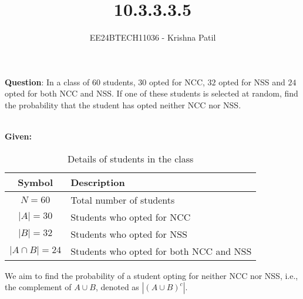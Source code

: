 \documentclass[journal]{IEEEtran}
\begin{document}

\vspace{3cm}

\title{10.3.3.3.5}
\author{EE24BTECH11036 - Krishna Patil}
{\let\newpage\relax\maketitle}

\renewcommand{\thefigure}{\theenumi}
\renewcommand{\thetable}{\theenumi}
\setlength{\intextsep}{10pt} %


\textbf{Question}: In a class of $60$ students, $30$ opted for NCC, $32$ opted for NSS and $24$ opted for both NCC and NSS. If one of these students is selected at random, find the probability that the student has opted neither NCC nor NSS. \\ \\
\solution

\textbf{Given:}

\begin{table}[h!]
    \centering
    \begin{tabular}{|c|l|}
        \hline
        \textbf{Symbol} & \textbf{Description} \\ \hline
        $N = 60$        & Total number of students \\ \hline
        $|A| = 30$      & Students who opted for NCC \\ \hline
        $|B| = 32$      & Students who opted for NSS \\ \hline
        $|A \cap B| = 24$ & Students who opted for both NCC and NSS \\ \hline
    \end{tabular}
    \caption{Details of students in the class}
\end{table}

We aim to find the probability of a student opting for neither NCC nor NSS, i.e., the complement of $A \cup B$, denoted as $|(A \cup B)^c|$.
\end{document}
